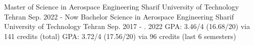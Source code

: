 \begin{cventries}
	
	
	\cventry
%	
	{Master of Science in Aerospace Engineering} %
	{Sharif University of Technology} %
	{Tehran} %
	{Sep. 2022 - Now} %
	{
}%
	\vspace{1mm} 
	\cventry
	{Bachelor Science in Aerospace Engineering} %
	{Sharif University of Technology} %
	{Tehran} %
	{Sep. 2017 - . 2022} %
	{
		\quad GPA: 3.46/4 (16.68/20) via 141 credits (total)
		\quad GPA: 3.72/4 (17.56/20) via 96 credits (last 6 semesters)
	}%
	
	
\end{cventries}
